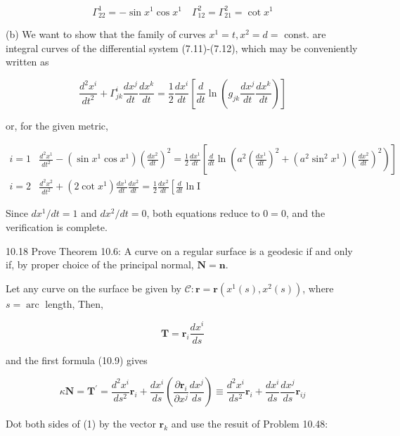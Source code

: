 \documentclass[10pt]{article}
\begin{document}
$$
\Gamma_{22}^{1}=-\sin x^{1} \cos x^{1} \quad \Gamma_{12}^{2}=\Gamma_{21}^{2}=\cot x^{1}
$$

(b) We want to show that the family of curves $x^{1}=t, x^{2}=d=$ const. are integral curves of the differential system (7.11)-(7.12), which may be conveniently written as

$$
\frac{d^{2} x^{i}}{d t^{2}}+\Gamma_{j k}^{i} \frac{d x^{j}}{d t} \frac{d x^{k}}{d t}=\frac{1}{2} \frac{d x^{i}}{d t}\left[\frac{d}{d t} \ln \left(g_{j k} \frac{d x^{j}}{d t} \frac{d x^{k}}{d t}\right)\right]
$$

or, for the given metric,

$$
\begin{array}{ll}
i=1 & \frac{d^{2} x^{1}}{d t^{2}}-\left(\sin x^{1} \cos x^{1}\right)\left(\frac{d x^{2}}{d t}\right)^{2}=\frac{1}{2} \frac{d x^{1}}{d t}\left[\frac{d}{d t} \ln \left(a^{2}\left(\frac{d x^{1}}{d t}\right)^{2}+\left(a^{2} \sin ^{2} x^{1}\right)\left(\frac{d x^{2}}{d t}\right)^{2}\right)\right] \\
i=2 & \frac{d^{2} x^{2}}{d t^{2}}+\left(2 \cot x^{1}\right) \frac{d x^{1}}{d t} \frac{d x^{2}}{d t}=\frac{1}{2} \frac{d x^{2}}{d t}\left[\frac{d}{d t} \ln \mathrm{I}\right.
\end{array}
$$

Since $d x^{1} / d t=1$ and $d x^{2} / d t=0$, both equations reduce to $0=0$, and the verification is complete.

10.18 Prove Theorem 10.6: A curve on a regular surface is a geodesic if and only if, by proper choice of the principal normal, $\mathbf{N}=\mathbf{n}$.

Let any curve on the surface be given by $\mathscr{C}: \mathbf{r}=\mathbf{r}\left(x^{1}(s), x^{2}(s)\right)$, where $s=\operatorname{arc}$ length, Then,

$$
\mathbf{T}=\mathbf{r}_{i} \frac{d x^{i}}{d s}
$$

and the first formula (10.9) gives


\begin{equation*}
\kappa \mathbf{N}=\mathbf{T}^{\prime}=\frac{d^{2} x^{i}}{d s^{2}} \mathbf{r}_{i}+\frac{d x^{i}}{d s}\left(\frac{\partial \mathbf{r}_{i}}{\partial x^{j}} \frac{d x^{j}}{d s}\right) \equiv \frac{d^{2} x^{i}}{d s^{2}} \mathbf{r}_{i}+\frac{d x^{i}}{d s} \frac{d x^{j}}{d s} \mathbf{r}_{i j} \tag{1}
\end{equation*}


Dot both sides of (1) by the vector $\mathbf{r}_{k}$ and use the resuit of Problem 10.48:
\end{document}
